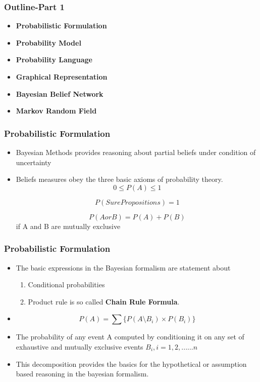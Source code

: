 \documentclass{beamer}
\begin{document}
\begin{frame}
\frametitle{\textbf{Outline-Part 1}}
\begin{itemize}
\item \textbf{Probabilistic Formulation}
\item \textbf{Probability Model}
\item \textbf{Probability Language}
\item \textbf{Graphical Representation}
\item \textbf{Bayesian Belief Network}
\item \textbf{Markov Random Field }
\end{itemize}
\end{frame}
\begin{frame}
\frametitle{\textbf{Probabilistic Formulation}}
\begin{itemize}
\item Bayesian Methods provides reasoning about partial beliefs under condition of uncertainty
\item Beliefs measures obey the three basic axioms of probability theory.
\begin{equation}
   0 \leq P(A) \leq 1
\end{equation}

\begin{equation}
    P(Sure Propositions)=1
\end{equation}

\begin{equation}
  P (A    or  B) = P(A)+ P(B)
\end{equation}
 if A and B are mutually exclusive
\end{itemize}
\end{frame}
\begin{frame}
\frametitle{\textbf{Probabilistic Formulation}}
\begin{itemize}
\item The basic expressions in the Bayesian formalism are statement about
\begin{enumerate}
\item Conditional probabilities
\item Product rule is so called \textbf{Chain Rule Formula}.
\end{enumerate}
\item  \begin{equation}
     P(A)= \sum \{P(A\setminus B_i)\times P(B_i)\}
\end{equation}
\item The probability of any event A computed by conditioning it on any set of exhaustive and mutually exclusive events $B_i,i=1,2,......n$
\item This decomposition provides the basics for the hypothetical or assumption based reasoning in the bayesian formalism.
\end{itemize}
\end{frame}
\end{document}
